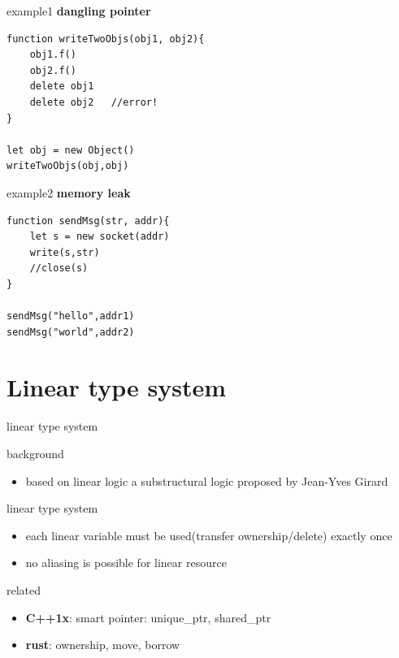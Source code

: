 \documentclass[10pt]{beamer}
\begin{document}
\begin{frame}[fragile]{example1}
\textbf{dangling pointer}
\begin{verbatim}
function writeTwoObjs(obj1, obj2){
    obj1.f()
    obj2.f()
    delete obj1
    delete obj2   //error!
}

let obj = new Object()
writeTwoObjs(obj,obj)
\end{verbatim}
\end{frame}


\begin{frame}[fragile]{example2}
\textbf{memory leak}
\begin{verbatim}
function sendMsg(str, addr){
    let s = new socket(addr)
    write(s,str)
    //close(s)
}

sendMsg("hello",addr1)
sendMsg("world",addr2)
\end{verbatim}
\end{frame}



\section{Linear type system}


\begin{frame}[fragile]{linear type system}
	
	\begin{block}{background}
	\begin{itemize}
		\item based on linear logic a substructural logic proposed by Jean-Yves Girard
	\end{itemize}
	\end{block}
	
	\begin{block}{linear type system}
	\begin{itemize}
		\item each linear variable must be used(transfer ownership/delete) exactly once
		\item no aliasing is possible for linear resource
	\end{itemize}
	\end{block}

	\begin{block}{related}
	\begin{itemize}
		\item \textbf{C++1x}: smart pointer: unique\_ptr, shared\_ptr
		\item \textbf{rust}:  ownership, move, borrow
	\end{itemize}
	\end{block}
\end{frame}
\end{document}

